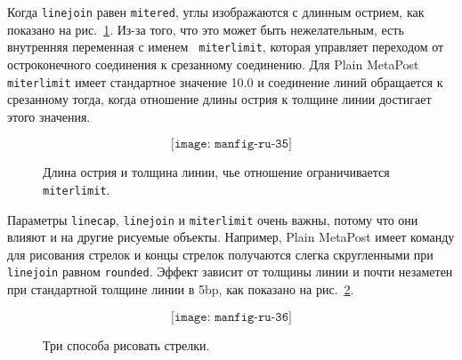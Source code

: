 \documentclass{article} %
\begin{document}
Когда {\tt linejoin} равен {\tt mitered}, углы изображаются с длинным 
острием, как показано на рис.~\ref{fig35}. 
Из-за того, что это может быть нежелательным, есть внутренняя 
переменная с именем {\tt
miterlimit}\label{Dmiterlim}, 
которая управляет переходом от остроконечного соединения к срезанному 
соединению. 
Для Plain MetaPost {\tt miterlimit} имеет стандартное значение 10.0 и 
соединение линий обращается к срезанному тогда, когда отношение 
длины острия к толщине линии достигает этого значения.

\begin{figure}[htp]
$$ \texttt{[image: manfig-ru-35]} $$
\caption{Длина острия и толщина линии, чье отношение ограничивается 
        {\tt miterlimit}.}
\label{fig35}
\end{figure}

Параметры {\tt linecap}, {\tt linejoin} и {\tt miterlimit} очень 
важны, потому что они влияют и на другие рисуемые объекты. 
Например, Plain MetaPost имеет команду для рисования 
стрелок и концы стрелок получаются слегка скругленными 
при {\tt linejoin} равном {\tt rounded}. 
Эффект зависит от толщины линии и почти незаметен при стандартной толщине 
линии в 5bp, как показано на рис.~\ref{fig36}.

\begin{figure}[htp]
$$\texttt{[image: manfig-ru-36]}$$
\caption{Три способа рисовать стрелки.}
\label{fig36}
\end{figure}
\end{document}
